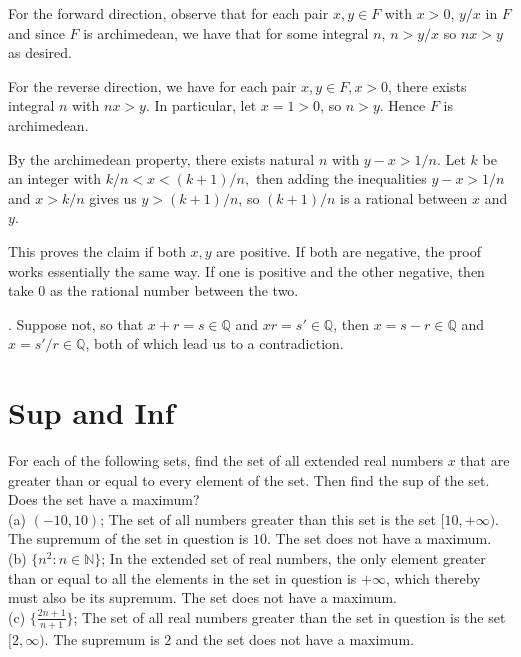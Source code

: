 \documentclass[12pt]{book}
\newenvironment{exercise}[2][Exercise]{\begin{trivlist}
\item[\hskip \labelsep {\bfseries #1}\hskip \labelsep {\bfseries #2.}]}{\end{trivlist}}
\begin{document}
\begin{exercise}{1.4.6}
For the forward direction, observe that for each pair $x, y \in F$ with $x > 0$, $y/x$ in $F$ and since $F$ is archimedean, we have that for some integral $n$, $n > y/x$ so $nx > y$ as desired.

For the reverse direction, we have for each pair $x, y \in F, x>0$, there exists integral $n$ with $nx > y$. In particular, let $x = 1 > 0$, so $n > y$. Hence $F$ is archimedean.
\end{exercise}

\begin{exercise}{1.4.7}
By the archimedean property, there exists natural $n$ with $y-x > 1/n$. Let $k$ be an integer with $k/n < x < (k+1)/n,$ then adding the inequalities $y-x > 1/n$ and $x > k/n$ gives us $y > (k+1)/n$, so $(k+1)/n$ is a rational between $x$ and $y$.

This proves the claim if both $x,y$ are positive. If both are negative, the proof works essentially the same way. If one is positive and the other negative, then take $0$ as the rational number between the two.
\end{exercise}

\begin{exercise}{1.4.8}.
Suppose not, so that $x + r = s \in \mathbb{Q}$ and $xr = s' \in \mathbb{Q}$, then $x = s-r \in \mathbb{Q}$ and $x = s'/r \in \mathbb{Q}$, both of which lead us to a contradiction.
\end{exercise}

\section{Sup and Inf}

\begin{exercise}{1.5.1}
For each of the following sets, find the set of all extended real numbers $x$ that are greater than or equal to every element of the set. Then find the sup of the set. Does the set have a maximum? \\
(a) $(-10, 10)$; The set of all numbers greater than this set is the set $[10, +\infty)$. The supremum of the set in question is $10$. The set does not have a maximum.\\
(b) $\{n^2 : n \in \mathbb{N}\}$; In the extended set of real numbers, the only element greater than or equal to all the elements in the set in question is $+\infty$, which thereby must also be its supremum. The set does not have a maximum.\\
(c) $\{ \frac{2n+1}{n+1}\}$; The set of all real numbers greater than the set in question is the set $[2,\infty)$. The supremum is $2$ and the set does not have a maximum.
\end{exercise}
\end{document}
